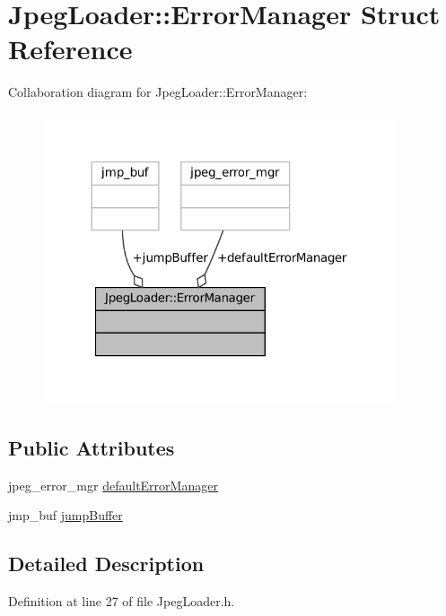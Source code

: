 \hypertarget{structJpegLoader_1_1ErrorManager}{}\section{Jpeg\+Loader\+::Error\+Manager Struct Reference}
\label{structJpegLoader_1_1ErrorManager}


Collaboration diagram for Jpeg\+Loader\+::Error\+Manager\+:
\nopagebreak
\begin{figure}[H]
\begin{center}
\leavevmode
\includegraphics[width=294pt]{structJpegLoader_1_1ErrorManager__coll__graph}
\end{center}
\end{figure}
\subsection*{Public Attributes}
\begin{DoxyCompactItemize}
\item 
jpeg\+\_\+error\+\_\+mgr \mbox{\hyperlink{structJpegLoader_1_1ErrorManager_a491d5424c61b6ac0388e0c88c9237b68}{default\+Error\+Manager}}
\item 
jmp\+\_\+buf \mbox{\hyperlink{structJpegLoader_1_1ErrorManager_a41824bc7f3e1d412c469b12a734c4dd4}{jump\+Buffer}}
\end{DoxyCompactItemize}


\subsection{Detailed Description}


Definition at line 27 of file Jpeg\+Loader.\+h.




